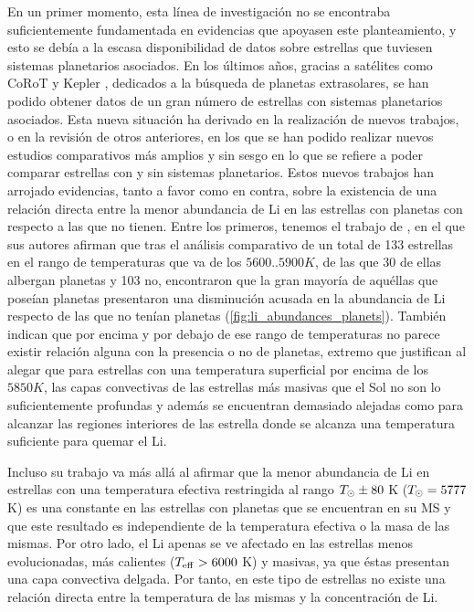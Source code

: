 En un primer momento, esta línea de investigación no se encontraba suficientemente fundamentada en evidencias que apoyasen este planteamiento, y esto se debía a la escasa disponibilidad de datos sobre estrellas que tuviesen sistemas planetarios asociados. En los últimos años, gracias a satélites como CoRoT \cite{Baglin2006} y Kepler \cite{Borucki2010}, dedicados a la búsqueda de planetas extrasolares, se han podido obtener datos de un gran número de estrellas con sistemas planetarios asociados. Esta nueva situación ha derivado en la realización de nuevos trabajos, o en la revisión de otros anteriores, en los que se han podido realizar nuevos estudios comparativos más amplios y sin sesgo en lo que se refiere a poder comparar estrellas con y sin sistemas planetarios. Estos nuevos trabajos han arrojado evidencias, tanto a favor como en contra, sobre la existencia de una relación directa entre la menor abundancia de Li en las estrellas con planetas con respecto a las que no tienen. Entre los primeros, tenemos el trabajo de \cite{Israelian2009}, en el que sus autores afirman que tras el análisis comparativo de un total de 133 estrellas en el rango de temperaturas que va de los $5600..5900 K$, de las que 30 de ellas albergan planetas y 103 no, encontraron que la gran mayoría de aquéllas que poseían planetas presentaron una disminución acusada en la abundancia de Li respecto de las que no tenían planetas (\ref{fig:li_abundances_planets}). También indican que por encima y por debajo de ese rango de temperaturas no parece existir relación alguna con la presencia o no de planetas, extremo que justifican al alegar que para estrellas con una temperatura superficial por encima de los $5850 K$, las capas convectivas de las estrellas más masivas que el Sol no son lo suficientemente profundas y además se encuentran demasiado alejadas como para alcanzar las regiones interiores de las estrella donde se alcanza una temperatura suficiente para quemar el Li.\par

Incluso su trabajo va más allá al afirmar que la menor abundancia de Li en estrellas con una temperatura efectiva restringida al rango $T_\odot \pm 80$ K ($T_\odot = 5777$ K) es una constante en las estrellas con planetas que se encuentran en su MS y que este resultado es independiente de la temperatura efectiva o la masa de las mismas. Por otro lado, el Li apenas se ve afectado en las estrellas menos evolucionadas, más calientes ($T_{\mathrm{eff}} > 6000$ K) y masivas, ya que éstas presentan una capa convectiva delgada. Por tanto, en este tipo de estrellas no existe una relación directa entre la temperatura de las mismas y la concentración de Li.\par

